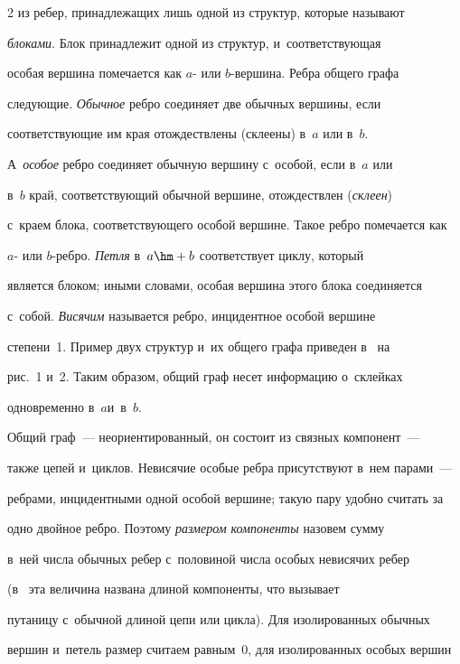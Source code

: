 \begin{multicols}{2}
из ребер, принадлежащих лишь одной из структур, которые называют 


\textit{блоками}. Блок принадлежит одной из структур, и~соответствующая 


особая вершина помечается как $a$- или $b$-вер\-ши\-на. Реб\-ра общего графа 


следующие. \textit{Обычное} реб\-ро соединяет две обычных вершины, если 


соответствующие им края отождествлены (склеены) в~$a$ или в~$b$. 


А~\textit{особое} реб\-ро соединяет обычную вершину с~особой, если в~$a$ или 


в~$b$ край, со\-от\-вет\-ст\-ву\-ющий обычной вершине, отож\-дествлен (\textit{склеен}) 


с~краем блока, со\-от\-вет\-ст\-ву\-юще\-го особой вершине. Такое реб\-ро помечается как 


$a$- или $b$-реб\-ро. \textit{Петля} в~$a\hm+b$ соответствует циклу, который 


является блоком; иными словами, особая вершина этого блока соединяется 


с~собой. \textit{Висячим} называется реб\-ро, инцидентное особой вершине 


степени~1. Пример двух структур и~их общего графа приведен в~\cite{3-gor} на 


рис.~1 и~2. Таким образом, общий граф несет информацию о~склейках 


одновременно в~$a$\linebreak и~в~$b$.


  


  Общий граф~--- неориентированный, он состоит из связных компонент~--- 


также цепей и~циклов. Невисячие особые реб\-ра присутствуют в~нем парами~--- 


реб\-ра\-ми, инцидентными одной особой вершине; такую пару удобно считать за 


одно двойное ребро. Поэтому \textit{размером компоненты} назовем сумму 


в~ней числа обычных ребер с~половиной числа особых невисячих ребер 


(в~\cite{2-gor} эта величина названа длиной компоненты, что вызывает 


путаницу с~обычной длиной цепи или цикла). Для изолированных обычных 


вершин и~петель размер считаем равным~0, для изолированных особых вершин 



\end{multicols}
